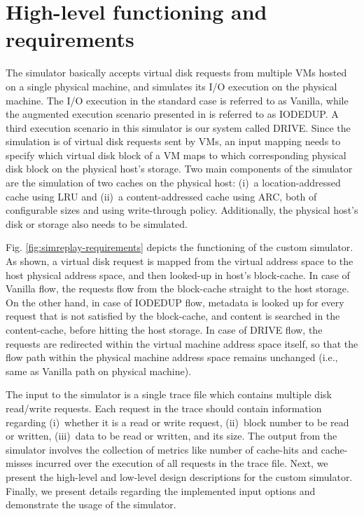 \section{High-level functioning and requirements}
The simulator basically accepts virtual disk requests from multiple VMs
hosted on a single physical machine, and simulates its I/O execution
on the physical machine. The I/O execution in the standard case is referred 
to as Vanilla, while the augmented execution scenario presented
in \cite{iodedup} is referred to as IODEDUP. A third execution 
scenario in this simulator is our system called DRIVE.
Since the simulation is of virtual disk requests sent by VMs, an input 
mapping needs to specify which virtual disk block of a VM maps to which
corresponding physical disk block on the physical host's storage.
Two main components of the simulator are the simulation of two 
caches on the physical host: 
(i)~a location-addressed cache using LRU and 
(ii)~a content-addressed cache using ARC, both
of configurable sizes and using write-through policy. 
Additionally, the physical host's disk or storage also needs to be simulated. 

Fig. \ref{fig:simreplay-requirements} depicts the functioning 
of the custom simulator.
As shown, a virtual disk request is mapped from the virtual address space to
the host physical address space, and then looked-up in host's block-cache.
In case of Vanilla flow, the requests flow from the block-cache straight
to the host storage. On the other hand, in case of IODEDUP flow, 
metadata is looked up for every request that is not satisfied by the
block-cache, and content is searched in the content-cache, before hitting
the host storage. In case of DRIVE flow, the requests are redirected
within the virtual machine address space itself, so that the flow path
within the physical machine address space remains unchanged (i.e., same
as Vanilla path on physical machine).

The input to the simulator is a single trace file which contains multiple
disk read/write requests. 
Each request in the trace should contain information regarding
(i)~whether it is a read or write request,
(ii)~block number to be read or written,
(iii)~data to be read or written, and its size.
The output from the simulator involves the collection of metrics like
number of cache-hits and cache-misses incurred over the execution of
all requests in the trace file.
Next, we present the high-level and low-level design descriptions 
for the custom simulator. Finally, we present details regarding the
implemented input options and demonstrate the usage of the simulator.

